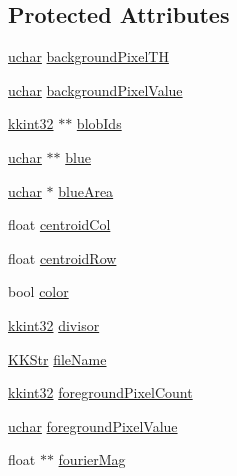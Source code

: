 \subsection*{Protected Attributes}
\begin{DoxyCompactItemize}
\item 
\hyperlink{namespace_k_k_b_ace9969169bf514f9ee6185186949cdf7}{uchar} \hyperlink{class_k_k_b_1_1_raster_a3c4e96eaf48274f5d8912617f81f2a0b}{background\+Pixel\+TH}
\item 
\hyperlink{namespace_k_k_b_ace9969169bf514f9ee6185186949cdf7}{uchar} \hyperlink{class_k_k_b_1_1_raster_ab7ed2191cce116a6a37029dc6e3713ef}{background\+Pixel\+Value}
\item 
\hyperlink{namespace_k_k_b_a8fa4952cc84fda1de4bec1fbdd8d5b1b}{kkint32} $\ast$$\ast$ \hyperlink{class_k_k_b_1_1_raster_a0fc9a1588e809db0b701f0a886bfd18c}{blob\+Ids}
\item 
\hyperlink{namespace_k_k_b_ace9969169bf514f9ee6185186949cdf7}{uchar} $\ast$$\ast$ \hyperlink{class_k_k_b_1_1_raster_a0265be7ea30f5b1f9d6310a79bee868b}{blue}
\item 
\hyperlink{namespace_k_k_b_ace9969169bf514f9ee6185186949cdf7}{uchar} $\ast$ \hyperlink{class_k_k_b_1_1_raster_af7996dfe61613e5ecf91454175bfe3f1}{blue\+Area}
\item 
float \hyperlink{class_k_k_b_1_1_raster_ac4cb3984d20f6eef6fd4f201681ea1d5}{centroid\+Col}
\item 
float \hyperlink{class_k_k_b_1_1_raster_a3380e5734ec57a147e36c734cc83c5ff}{centroid\+Row}
\item 
bool \hyperlink{class_k_k_b_1_1_raster_a482384d89cc53fa4f36276307c746854}{color}
\item 
\hyperlink{namespace_k_k_b_a8fa4952cc84fda1de4bec1fbdd8d5b1b}{kkint32} \hyperlink{class_k_k_b_1_1_raster_afaaaf54fd824a4a47fba97f7fba9398f}{divisor}
\item 
\hyperlink{class_k_k_b_1_1_k_k_str}{K\+K\+Str} \hyperlink{class_k_k_b_1_1_raster_a742e1da027493443f2dda570a89fe2e9}{file\+Name}
\item 
\hyperlink{namespace_k_k_b_a8fa4952cc84fda1de4bec1fbdd8d5b1b}{kkint32} \hyperlink{class_k_k_b_1_1_raster_aa7e86253f4b9c347da718732e44b60e8}{foreground\+Pixel\+Count}
\item 
\hyperlink{namespace_k_k_b_ace9969169bf514f9ee6185186949cdf7}{uchar} \hyperlink{class_k_k_b_1_1_raster_ac9a5cec097e9fed669fe3c44bcc1678c}{foreground\+Pixel\+Value}
\item 
float $\ast$$\ast$ \hyperlink{class_k_k_b_1_1_raster_a16d18df2f29a49c7a8ee670e0ea0c3a9}{fourier\+Mag}
$$
\end{DoxyCompactItemize}
